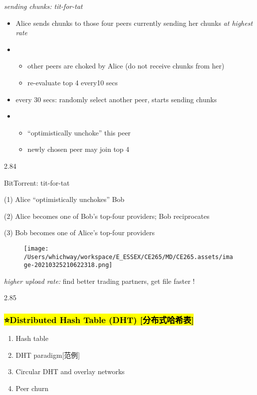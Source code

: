 \documentclass[
]{article}
\begin{document}
\emph{sending chunks: tit-for-tat}

\begin{itemize}
\item
  Alice sends chunks to those four peers currently sending her chunks
  \emph{at highest rate}
\item
  \begin{itemize}
  \item
    other peers are choked by Alice (do not receive chunks from her)
  \item
    re-evaluate top 4 every10 secs
  \end{itemize}
\item
  every 30 secs: randomly select another peer, starts sending chunks
\item
  \begin{itemize}
  \item
    ``optimistically unchoke'' this peer
  \item
    newly chosen peer may join top 4
  \end{itemize}
\end{itemize}

2.84

BitTorrent: tit-for-tat

(1) Alice ``optimistically unchokes'' Bob

(2) Alice becomes one of Bob's top-four providers; Bob reciprocates

(3) Bob becomes one of Alice's top-four providers

\begin{figure}
\centering
\texttt{[image: /Users/whichway/workspace/E\_ESSEX/CE265/MD/CE265.assets/image-20210325210622318.png]}
\caption{}
\end{figure}

\emph{higher upload rate:} find better trading partners, get file faster
!

2.85

\hypertarget{distributed-hash-table-dht-ux5206ux5e03ux5f0fux54c8ux5e0cux8868}{%
\subsubsection{\texorpdfstring{\hl{⭐️Distributed Hash Table (DHT)
{[}分布式哈希表{]}}}{⭐️Distributed Hash Table (DHT) {[}分布式哈希表{]}}}\label{distributed-hash-table-dht-ux5206ux5e03ux5f0fux54c8ux5e0cux8868}}

\begin{enumerate}
\def\labelenumi{\arabic{enumi}.}
\item
  Hash table
\item
  DHT paradigm{[}范例{]}
\item
  Circular DHT and overlay networks
\item
  Peer churn
\end{enumerate}
\end{document}
